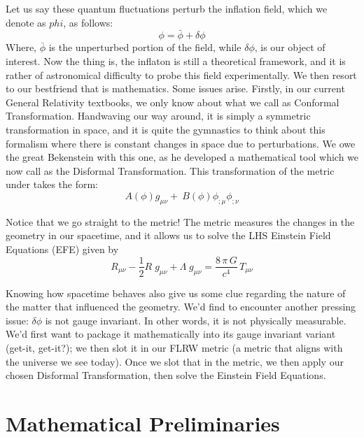 \documentclass[a4paper,11pt]{article}
\begin{document}
Let us say these quantum fluctuations perturb the inflation field, which we denote as $phi$, as follows:
\begin{equation}
    \phi = \bar{\phi} + \delta\phi
\end{equation}
Where, $\bar{\phi}$ is the unperturbed portion of the field, while $\delta\phi$, is our object of interest. Now the thing is,
the inflaton is still a theoretical framework, and it is rather of astronomical difficulty to probe this field experimentally.
We then resort to our bestfriend that is mathematics. 
Some issues arise. Firstly, in our current General Relativity textbooks, we only know about what we call as Conformal Transformation.
Handwaving our way around, it is simply a symmetric transformation in space, and it is quite the gymnastics to think about this 
formalism where there is constant changes in space due to perturbations. We owe the great Bekenstein with this one, as he developed a mathematical
tool which we now call as the Disformal Transformation. This transformation of the metric under takes the form:
\begin{equation}
    A ( \phi ) g _ { \mu \nu } + \ B ( \phi ) \phi _ { ; \mu } \phi _ { ; \nu }
\end{equation}

Notice that we go straight to the metric! The metric measures the changes in the geometry in our spacetime, and it allows us to solve
the LHS Einstein Field Equations (EFE) given by 
\begin{equation}
    R _ { \mu \nu } - \frac { 1 } { 2 } R \; g _ { \mu \nu } + \Lambda \; g _ { \mu \nu } = \frac { 8 \, \pi \, G } { c ^ { 4 } } \, T _ { \mu \nu }
\end{equation}

Knowing how spacetime behaves also give us some clue regarding the nature of the matter that influenced the geometry. We'd find to encounter 
another pressing issue: $\delta \phi$ is not gauge invariant. In other words, it is not physically measurable. We'd first want to 
package it mathematically into its gauge invariant variant (get-it, get-it?); we then slot it in our FLRW metric (a metric that aligns
with the universe we see today). Once we slot that in the metric, we then apply our chosen Disformal Transformation, then solve the Einstein Field Equations. 




\section{Mathematical Preliminaries} 
\end{document}
